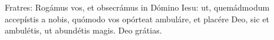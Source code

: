 Fratres: Rogámus vos, et obsecrámus in Dómino Iesu: ut, quemádmodum accepístis a nobis, quómodo vos opórteat ambuláre, et placére Deo, sic et ambulétis, ut abundétis magis. \rubric{\Rbar} Deo grátias.
